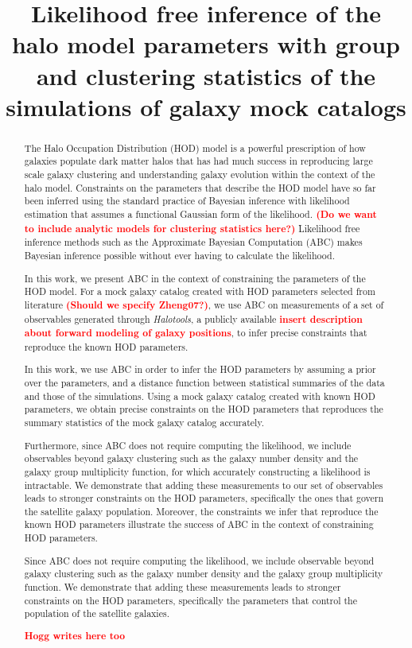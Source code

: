 \documentclass[12pt, preprint]{aastex}
\newcommand{\todo}[1]{{\bf \textcolor{red}{ #1}}}
\begin{document}
\title{Likelihood free inference of the halo model parameters with group and clustering 
       statistics of the simulations of galaxy mock catalogs}

\begin{abstract}
The Halo Occupation Distribution (HOD) model is a powerful prescription of how galaxies
populate dark matter halos that has had much success in reproducing large scale galaxy
clustering and understanding galaxy evolution within the context of the halo model.
Constraints on the parameters that describe the HOD model have so far been inferred using 
the standard practice of Bayesian inference with likelihood estimation that assumes a
functional Gaussian form of the likelihood.\todo{(Do we want to include analytic models for clustering statistics here?)} Likelihood free inference methods such as the
Approximate Bayesian Computation (ABC) makes Bayesian inference possible without ever 
having to calculate the likelihood. 

In this work, we present ABC in the context of constraining the parameters of the HOD model.
For a mock galaxy catalog created with HOD parameters selected from literature
\todo{(Should we specify Zheng07?)}, we use ABC on measurements of a set of observables
generated through {\it Halotools}, a publicly available \todo{insert description about
forward modeling of galaxy positions}, to infer precise constraints that reproduce the 
known HOD parameters. 

In this work, we use ABC in order to infer the HOD parameters by assuming a prior over the parameters, and a distance function between 
statistical summaries of the data and those of the simulations.
Using a mock galaxy catalog created with known HOD parameters, we obtain precise constraints on the HOD parameters that 
reproduces the summary statistics of the mock galaxy catalog accurately. 



Furthermore, since ABC does not require computing the likelihood, we include observables
beyond galaxy clustering such as the galaxy number density and the galaxy group 
multiplicity function, for which accurately constructing a likelihood is intractable. We demonstrate that adding these measurements to our set of observables leads to stronger constraints on the HOD parameters, 
 specifically the ones that govern the satellite galaxy population. Moreover, the constraints we infer that reproduce the known HOD parameters illustrate the success of ABC in the context of constraining HOD parameters.
 
Since ABC does not require computing the likelihood, we include observable beyond galaxy clustering such as 
the galaxy number density and the galaxy group multiplicity function. 
We demonstrate that adding these measurements leads to stronger constraints on the HOD parameters, specifically the parameters 
that control the population of the satellite galaxies.

\todo{Hogg writes here too}

\end{abstract}
\end{document}
